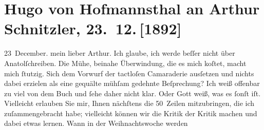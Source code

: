 

         
         \newcommand{\erwaehntePersonen}{Personen: Bertha Flegmann, Paul Horn, Dorothea Kohnberger, Carl Schroeder}
         \newcommand{\erwaehnteOrte}{Orte: Wien}
         \newcommand{\erwaehnteWerke}{Werke: Anatol, Aspasia}
               \section[Hugo von Hofmannsthal an Arthur Schnitzler, 23. 12. {[}1892{]}]{ Hugo von Hofmannsthal an Arthur Schnitzler, 23. 12. {[}1892{]}}\nopagebreak{}\rehead{ }\begin{ledgroupsized}[t]{13cm}\normalsize\beginnumbering \toendnotes[C]{\smallbreak\pagebreak[2]} 
\toendnotes[C]{\smallbreak}\pstart
           \raggedleft{}{\pb}23 December.\pend
           \pstart{}mein lieber Arthur.\pend\pstart
           Ich glaube, ich werde beſſer nicht über Anatolſchreiben. Die Mühe, beinahe Überwindung, die es
               mich koſtet, macht mich ſtutzig. Sich dem Vorwurf der tactloſen Camaraderie ausſetzen
               und nichts dabei erzielen als eine gequälte mühſam gedehnte Beſprechung?\pend
           \pstart
           Ich weiß offenbar zu viel von dem Buch und ſehe daher nicht klar. Oder Gott weiß, was es ſonſt iſt. Vielleicht
               erlauben {\pb}Sie mir, Ihnen nächſtens
               die 50 Zeilen mitzubringen, die ich zuſammengebracht habe; vielleicht können wir die
               Kritik der Kritik machen und dabei etwas lernen. Wann in der Weihnachtswoche werden

\end{ledgroupsized}

